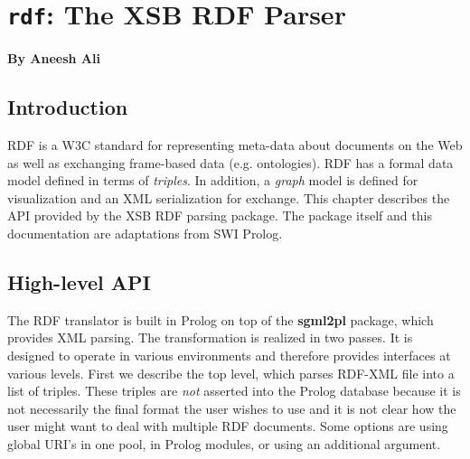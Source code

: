 
\chapter{{\tt rdf}: The XSB RDF Parser}

\begin{center}
  {\Large {\bf By Aneesh Ali}}
\end{center}

\section{Introduction}

RDF is a W3C standard for representing meta-data about documents
on the Web as well as exchanging frame-based data (e.g. ontologies). RDF
has a formal
data model defined in terms of {\it triples}. In addition, a
{\it graph} model is defined for visualization and an XML serialization
for exchange.
This chapter describes the API provided by the XSB RDF parsing package.
The package itself and this documentation are adaptations
from SWI Prolog.


\section{High-level API}

The RDF translator is built in Prolog on top of the {\bf sgml2pl}
package, which provides XML parsing.
The transformation is realized in two passes.
It is designed to operate in various environments and therefore
provides interfaces at various levels. First we describe the top level,
which parses RDF-XML file into a list of
triples. These triples are {\em not} asserted into the Prolog database
because it is not necessarily the final format the user wishes to use
and it is not clear how the user might want to deal with multiple RDF
documents.  Some options are using global URI's in one pool, in Prolog
modules, or using an additional argument.

